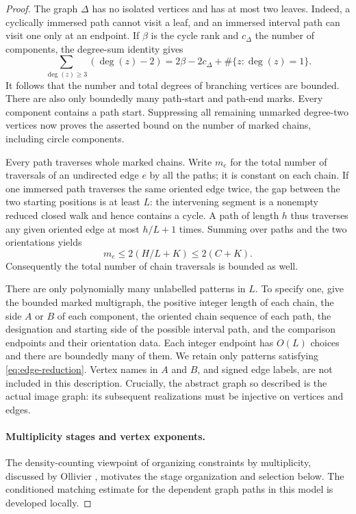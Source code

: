 \begin{proof}
The graph \(\Delta\) has no isolated vertices and has at most two leaves.
Indeed, a cyclically immersed path cannot visit a leaf, and an immersed
interval path can visit one only at an endpoint.  If \(\beta\) is the
cycle rank and \(c_\Delta\) the number of components, the degree-sum
identity gives
\[
 \sum_{\deg(z)\ge3}(\deg(z)-2)
 =2\beta-2c_\Delta+\#\{z:\deg(z)=1\}.
\]
It follows that the number and total degrees of branching vertices are
bounded.  There are also only boundedly many path-start and path-end
marks.  Every component contains a path start.  Suppressing all remaining
unmarked degree-two vertices now proves the asserted bound on the
number of marked chains, including circle components.

Every path traverses whole marked chains.  Write \(m_e\) for the total
number of traversals of an undirected edge \(e\) by all the paths; it is
constant on each chain.  If one immersed path traverses the same
oriented edge twice, the gap between the two starting positions is at
least \(L\): the intervening segment is a nonempty reduced closed walk
and hence contains a cycle.  A path of length \(h\) thus traverses any
given oriented edge at most \(h/L+1\) times.  Summing over paths and the
two orientations yields
\begin{equation}
 m_e\le 2(H/L+K)\le2(C+K).
 \label{eq:entropy-multiplicity}
\end{equation}
Consequently the total number of chain traversals is bounded as well.

There are only polynomially many unlabelled patterns in \(L\).  To
specify one, give the bounded marked multigraph, the positive integer
length of each chain, the side \(A\) or \(B\) of each component, the
oriented chain sequence of each path, the designation and starting side
of the possible interval path, and the comparison endpoints and their
orientation data.  Each integer endpoint has \(O(L)\) choices and there
are boundedly many of them.  We retain only patterns satisfying
\eqref{eq:edge-reduction}.  Vertex names in \(A\) and \(B\), and signed
edge labels, are not included in this description.  Crucially, the
abstract graph so described is the actual image graph: its subsequent
realizations must be injective on vertices and edges.

\paragraph{Multiplicity stages and vertex exponents.}
The density-counting viewpoint of organizing constraints by multiplicity,
discussed by Ollivier \cite{Ollivier2005}, motivates the stage organization
and selection below.  The conditioned matching estimate for the dependent
graph paths in this model is developed locally.


\end{proof}

